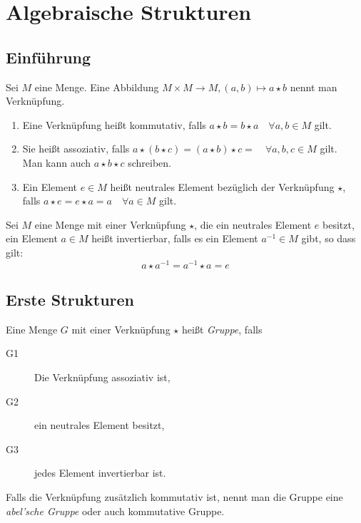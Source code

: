 \chapter{Algebraische Strukturen}

\section{Einführung}
Sei $M$ eine Menge. Eine Abbildung $M\times M \rightarrow M, (a,b)\mapsto a\star b$ nennt man Verknüpfung.

\begin{enumerate}
  \item Eine Verknüpfung heißt kommutativ, falls $a\star b = b\star a \quad\forall a,b\in M$ gilt.
  \item Sie heißt assoziativ, falls $a\star(b\star c)=(a\star b)\star c = \quad\forall a,b,c\in M$ gilt.\\
  Man kann auch $a\star b\star c$ schreiben.
  \item Ein Element $e\in M$ heißt neutrales Element bezüglich der Verknüpfung $\star$,\\
  falls $a\star e = e\star a=a \quad\forall a\in M$ gilt.
\end{enumerate}

Sei $M$ eine Menge mit einer Verknüpfung $\star$, die ein neutrales Element $e$ besitzt, ein Element $a\in M$ heißt invertierbar, falls es ein Element $a^{-1}\in M$ gibt, so dass gilt:
\begin{equation*}
  a\star a^{-1} = a^{-1} \star a = e
\end{equation*}

\section{Erste Strukturen}
Eine Menge $G$ mit einer Verknüpfung $\star$ heißt \emph{Gruppe}, falls
\begin{description}
  \item[G1] Die Verknüpfung assoziativ ist,\label{gruppe1}
  \item[G2] ein neutrales Element besitzt,
  \item[G3] jedes Element invertierbar ist.\label{gruppe3}
\end{description}
Falls die Verknüpfung zusätzlich kommutativ ist, nennt man die Gruppe eine \emph{abel'sche Gruppe} oder auch kommutative Gruppe.

